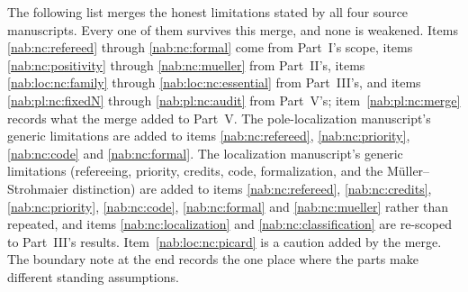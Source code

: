 \documentclass[11pt,letterpaper]{article}
\theoremstyle{definition}
\theoremstyle{remark}
\numberwithin{equation}{section}
\begin{document}
The following list merges the honest limitations stated by all four source
manuscripts. Every one of them survives this merge, and none is weakened.
Items \ref{nab:nc:refereed} through \ref{nab:nc:formal} come from Part~I's
scope, items \ref{nab:nc:positivity} through \ref{nab:nc:mueller} from
Part~II's, items \ref{nab:loc:nc:family} through
\ref{nab:loc:nc:essential} from Part~III's, and items \ref{nab:pl:nc:fixedN}
through \ref{nab:pl:nc:audit} from Part~V's; item~\ref{nab:pl:nc:merge} records
what the merge added to Part~V. The pole-localization manuscript's generic
limitations are added to items \ref{nab:nc:refereed}, \ref{nab:nc:priority},
\ref{nab:nc:code} and \ref{nab:nc:formal}. The localization manuscript's
generic limitations (refereeing, priority, credits, code, formalization, and
the M\"uller--Strohmaier distinction) are added to items \ref{nab:nc:refereed},
\ref{nab:nc:credits}, \ref{nab:nc:priority}, \ref{nab:nc:code},
\ref{nab:nc:formal} and \ref{nab:nc:mueller} rather than repeated, and items
\ref{nab:nc:localization} and \ref{nab:nc:classification} are re-scoped to
Part~III's results. Item~\ref{nab:loc:nc:picard} is a caution added by the
merge. The boundary note at the end records the one place where the parts make
different standing assumptions.
\end{document}
